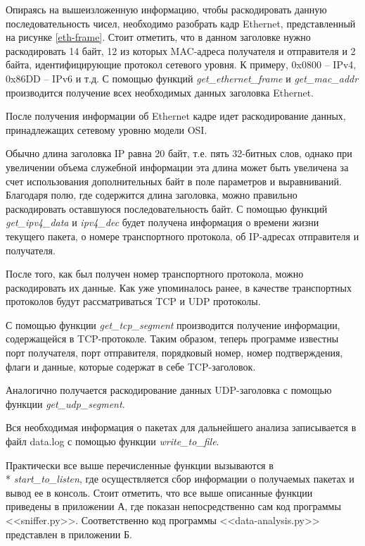 \documentclass[bachelor, och, coursework]{SCWorks}
\begin{document}
    Опираясь на вышеизложенную информацию, чтобы раскодировать данную последовательность чисел, необходимо разобрать кадр Ethernet, представленный
    на рисунке \ref{eth-frame}. Стоит отметить, что в данном заголовке нужно раскодировать 14 байт, 12 из которых MAC-адреса получателя и 
    отправителя и 2 байта, идентифицирующие протокол
    сетевого уровня. К примеру, 0x0800 -- IPv4, 0x86DD -- IPv6 и т.д. С помощью функций \textit{get\_ethernet\_frame} и \textit{get\_mac\_addr}
    производится получение всех необходимых
    данных заголовка Ethernet.
    
    После получения информации об Ethernet кадре идет раскодирование данных, принадлежащих сетевому уровню модели OSI. 
    
    Обычно длина заголовка IP равна 20 байт, т.е. пять 32-битных слов, однако при увеличении объема служебной информации эта длина может быть увеличена
    за счет использования дополнительных байт в поле параметров и выравниваний. Благодаря полю, где содержится
    длина заголовка, можно правильно раскодировать оставшуюся последовательность байт. С помощью функций \textit{get\_ipv4\_data} и \textit{ipv4\_dec}
    будет получена информация о времени жизни текущего пакета, о номере транспортного протокола, об IP-адресах отправителя и получателя.

    После того, как был получен номер транспортного протокола, можно раскодировать их данные. Как уже упоминалось ранее,
    в качестве транспортных протоколов будут рассматриваться TCP и UDP протоколы. 

    С помощью функции \textit{get\_tcp\_segment} производится получение информации, содержащейся в TCP-протоколе. Таким образом,
    теперь программе известны порт получателя, порт отправителя, порядковый номер, номер подтверждения, флаги и данные, которые
    содержат в себе TCP-заголовок.

    Аналогично получается раскодирование данных UDP-заголовка с помощью функции \textit{get\_udp\_segment}.

    Вся необходимая информация о пакетах для дальнейшего анализа записывается в файл data.log с помощью функции \textit{write\_to\_file}.

    Практически все выше перечисленные функции вызываются в \\* \textit{start\_to\_listen}, где осуществляется сбор информации
    о получаемых пакетах и вывод ее в консоль. Стоит отметить, что все выше описанные функции приведены в приложении А, где
    показан непосредственно сам код программы <<sniffer.py>>. Соответственно код программы <<data-analysis.py>> представлен в приложении Б.
\end{document}

